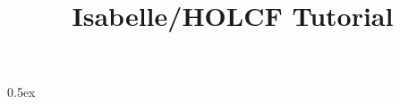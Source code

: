\documentclass[11pt,a4paper]{article}
\begin{document}
\title{Isabelle/HOLCF Tutorial}
\maketitle

\tableofcontents



\parindent 0pt\parskip 0.5ex

\end{document}
